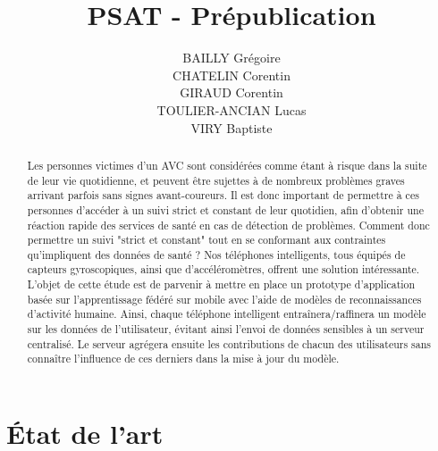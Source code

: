 \documentclass{article}
\begin{document}
\title{PSAT - Prépublication}
\author{BAILLY Grégoire \\ CHATELIN Corentin \\ GIRAUD Corentin \\ TOULIER-ANCIAN Lucas \\ VIRY Baptiste }

\maketitle

\begin{abstract}

Les personnes victimes d'un AVC sont considérées comme étant à risque dans la suite de leur vie quotidienne, et peuvent être sujettes à de nombreux problèmes graves arrivant parfois sans signes avant-coureurs. Il est donc important de permettre à ces personnes d'accéder à un suivi strict et constant de leur quotidien, afin d'obtenir une réaction rapide des services de santé en cas de détection de problèmes. Comment donc permettre un suivi "strict et constant" tout en se conformant aux contraintes qu'impliquent des données de santé ? Nos téléphones intelligents, tous équipés de capteurs gyroscopiques, ainsi que d'accéléromètres, offrent une solution intéressante. L'objet de cette étude est de parvenir à mettre en place un prototype d'application basée sur l'apprentissage fédéré sur mobile avec l'aide de modèles de reconnaissances d'activité humaine. Ainsi, chaque téléphone intelligent entraînera/raffinera un modèle sur les données de l'utilisateur, évitant ainsi l'envoi de données sensibles à un serveur centralisé. Le serveur agrégera ensuite les contributions de chacun des utilisateurs sans connaître l'influence de ces derniers dans la mise à jour du modèle.

\end{abstract}

\section{État de l'art}
\end{document}

